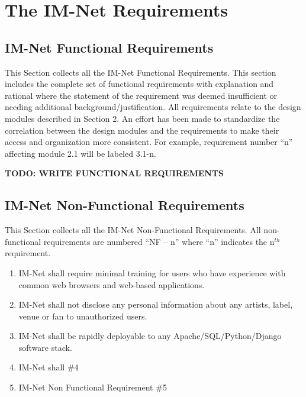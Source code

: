 \documentclass[letterpaper]{article}
\begin{document}
\eject

\section{The IM-Net Requirements}
 
\subsection{IM-Net Functional Requirements}

This Section collects all the IM-Net Functional Requirements. This section includes the complete set of functional requirements with explanation and rational where the statement of the requirement was deemed insufficient or needing additional background/justification. All requirements relate to the design modules described in Section 2. An effort has been made to standardize the correlation between the design modules and the requirements to make their access and organization more consistent. For example, requirement number ``n'' affecting module 2.1 will be labeled 3.1-n.

\textbf{TODO: WRITE FUNCTIONAL REQUIREMENTS}\\

\subsection{IM-Net Non-Functional Requirements}

This Section collects all the IM-Net Non-Functional Requirements. All non-functional requirements are numbered ``NF -- n'' where ``n'' indicates the n${}^{th}$ requirement.

\begin{enumerate}
\item  IM-Net shall require minimal training for users who have experience with common web browsers and web-based applications.

\item  IM-Net shall not disclose any personal information about any artists, label, venue or fan to unauthorized users.

\item  IM-Net shall be rapidly deployable to any Apache/SQL/Python/Django software stack.

\item  IM-Net shall  \#4

\item  IM-Net Non Functional Requirement \#5
\end{enumerate}
\end{document}

